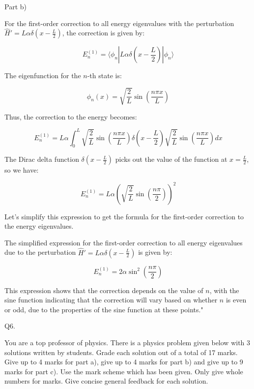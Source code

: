 Part b)

For the first-order correction to all energy eigenvalues with the perturbation \( \hat{H}' = L\alpha \delta\left(x - \frac{L}{2} \right) \), the correction is given by:

\[ E_{n}^{(1)} = \langle \phi_{n} | L\alpha \delta\left(x - \frac{L}{2} \right) | \phi_{n} \rangle \]

The eigenfunction for the \( n \)-th state is:

\[ \phi_{n}(x) = \sqrt{\frac{2}{L}} \sin\left(\frac{n \pi x}{L} \right) \]

Thus, the correction to the energy becomes:

\[ E_{n}^{(1)} = L\alpha \int_{0}^{L} \sqrt{\frac{2}{L}} \sin\left(\frac{n \pi x}{L}\right) \delta\left(x - \frac{L}{2} \right) \sqrt{\frac{2}{L}} \sin\left(\frac{n \pi x}{L}\right) dx \]

The Dirac delta function \( \delta\left(x - \frac{L}{2} \right) \) picks out the value of the function at \( x = \frac{L}{2} \), so we have:

\[ E_{n}^{(1)} = L\alpha \left(\sqrt{\frac{2}{L}} \sin\left(\frac{n \pi}{2}\right)\right)^{2} \]

Let's simplify this expression to get the formula for the first-order correction to the energy eigenvalues.

The simplified expression for the first-order correction to all energy eigenvalues due to the perturbation \( \hat{H}' = L\alpha \delta\left(x - \frac{L}{2} \right) \) is given by:

\[ E_{n}^{(1)} = 2\alpha \sin^{2}\left(\frac{n\pi}{2}\right) \]

This expression shows that the correction depends on the value of \( n \), with the sine function indicating that the correction will vary based on whether \( n \) is even or odd, due to the properties of the sine function at these points."



                           Q6. 

You are a top professor of physics. There is a physics problem given below with 3 solutions written by students. Grade each solution out of a total of 17 marks. Give up to 4 marks for part a), give up to 4 marks for part b) and give up to 9 marks for part c). Use the mark scheme which has been given. Only give whole numbers for marks. Give concise general feedback for each solution. 

